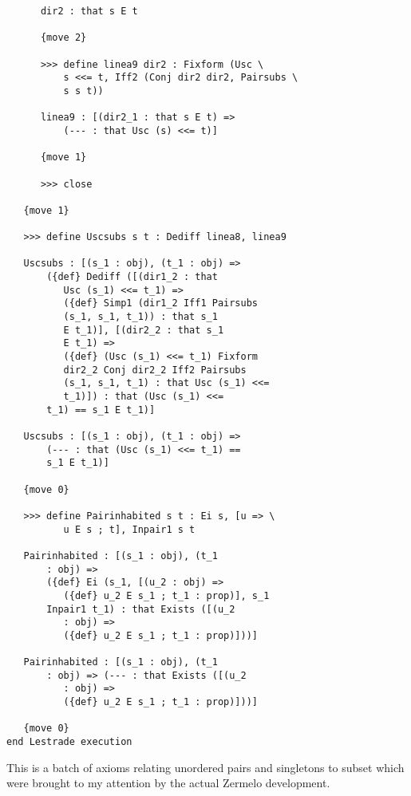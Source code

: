 \documentclass[12pt]{article}
\begin{document}
\begin{verbatim}
      dir2 : that s E t

      {move 2}

      >>> define linea9 dir2 : Fixform (Usc \
          s <<= t, Iff2 (Conj dir2 dir2, Pairsubs \
          s s t))

      linea9 : [(dir2_1 : that s E t) => 
          (--- : that Usc (s) <<= t)]

      {move 1}

      >>> close

   {move 1}

   >>> define Uscsubs s t : Dediff linea8, linea9

   Uscsubs : [(s_1 : obj), (t_1 : obj) => 
       ({def} Dediff ([(dir1_2 : that 
          Usc (s_1) <<= t_1) => 
          ({def} Simp1 (dir1_2 Iff1 Pairsubs 
          (s_1, s_1, t_1)) : that s_1 
          E t_1)], [(dir2_2 : that s_1 
          E t_1) => 
          ({def} (Usc (s_1) <<= t_1) Fixform 
          dir2_2 Conj dir2_2 Iff2 Pairsubs 
          (s_1, s_1, t_1) : that Usc (s_1) <<= 
          t_1)]) : that (Usc (s_1) <<= 
       t_1) == s_1 E t_1)]

   Uscsubs : [(s_1 : obj), (t_1 : obj) => 
       (--- : that (Usc (s_1) <<= t_1) == 
       s_1 E t_1)]

   {move 0}

   >>> define Pairinhabited s t : Ei s, [u => \
          u E s ; t], Inpair1 s t

   Pairinhabited : [(s_1 : obj), (t_1 
       : obj) => 
       ({def} Ei (s_1, [(u_2 : obj) => 
          ({def} u_2 E s_1 ; t_1 : prop)], s_1 
       Inpair1 t_1) : that Exists ([(u_2 
          : obj) => 
          ({def} u_2 E s_1 ; t_1 : prop)]))]

   Pairinhabited : [(s_1 : obj), (t_1 
       : obj) => (--- : that Exists ([(u_2 
          : obj) => 
          ({def} u_2 E s_1 ; t_1 : prop)]))]

   {move 0}
end Lestrade execution
\end{verbatim}

This is a batch of axioms relating unordered pairs and singletons to subset which were brought to my attention by the actual Zermelo development.
\end{document}

